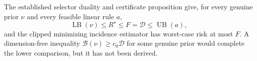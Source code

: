 The established selector duality and certificate proposition give, for every genuine prior \(\nu\) and every feasible linear rule \(a\),
\[
 \operatorname{LB}(\nu)\le R^{\star}\le F=\mathcal D\le\operatorname{UB}(a),
\]
and the clipped minimizing incidence estimator has worst-case risk at most \(F\).  A dimension-free inequality \(\mathcal B(\nu)\ge c_0\mathcal D\) for some genuine prior would complete the lower comparison, but it has not been derived.